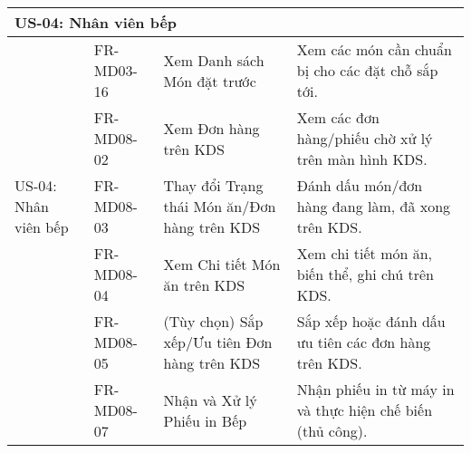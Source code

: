 \begin{longtable}{|m{2.5cm}|m{2.5cm}|m{5cm}|m{5cm}|}
	\multicolumn{4}{|l|}{\textbf{US-04: Nhân viên bếp}}                                                                                                                                                                                    \\ \hline
	\multirow{5}{=}[2pt]{US-04: Nhân viên bếp}              & FR-MD03-16            & Xem Danh sách Món đặt trước                            & Xem các món cần chuẩn bị cho các đặt chỗ sắp tới.                                           \\ \cline{2-4}
	                                                        & FR-MD08-02            & Xem Đơn hàng trên KDS                                  & Xem các đơn hàng/phiếu chờ xử lý trên màn hình KDS.                                         \\
	                                                        & FR-MD08-03            & Thay đổi Trạng thái Món ăn/Đơn hàng trên KDS           & Đánh dấu món/đơn hàng đang làm, đã xong trên KDS.                                           \\
	                                                        & FR-MD08-04            & Xem Chi tiết Món ăn trên KDS                           & Xem chi tiết món ăn, biến thể, ghi chú trên KDS.                                            \\
	                                                        & FR-MD08-05            & (Tùy chọn) Sắp xếp/Ưu tiên Đơn hàng trên KDS           & Sắp xếp hoặc đánh dấu ưu tiên các đơn hàng trên KDS.                                        \\
	                                                        & FR-MD08-07            & Nhận và Xử lý Phiếu in Bếp                             & Nhận phiếu in từ máy in và thực hiện chế biến (thủ công).                                   \\
	\hline


\end{longtable}
